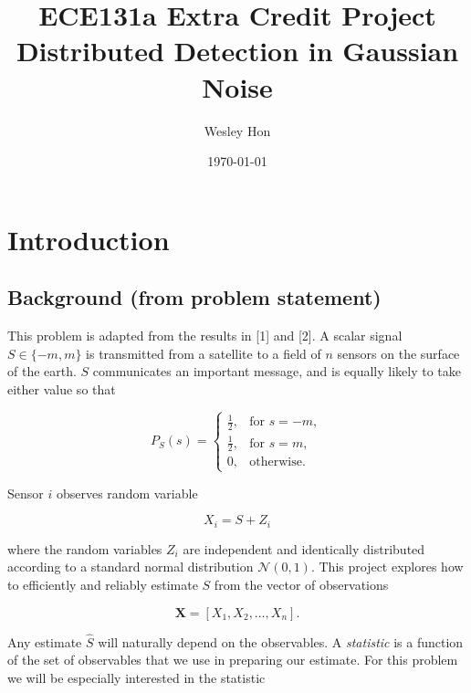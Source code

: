 \documentclass[12pt,a4paper]{article}
\title{ECE131a Extra Credit Project\\ {Distributed Detection in Gaussian Noise}}
\author{Wesley Hon}
\date{\today}
\begin{document}
\maketitle


\tableofcontents
\clearpage


\section{Introduction}

\subsection{Background (from problem statement)}
This problem is adapted from the results in [1] and [2]. A scalar signal
$S \in \{-m,m\}$ is transmitted from a satellite to a field of $n$ sensors
on the surface of the earth. $S$ communicates an important message, and is
equally likely to take either value so that

\[
P_S(s)=
\begin{cases}
\frac{1}{2}, & \text{for } s=-m,\\[4pt]
\frac{1}{2}, & \text{for } s=m,\\[4pt]
0, & \text{otherwise}.
\end{cases}
\]

Sensor $i$ observes random variable

\[
X_i = S + Z_i
\]

where the random variables $Z_i$ are independent and identically distributed
according to a standard normal distribution $\mathcal{N}(0,1)$.
This project explores how to efficiently and reliably estimate $S$ from the
vector of observations

\[
\mathbf{X} = [X_1, X_2, \ldots, X_n].
\]

Any estimate $\hat{S}$ will naturally depend on the observables.
A \emph{statistic} is a function of the set of observables that we use in
preparing our estimate. For this problem we will be especially interested in
the statistic
\end{document}
